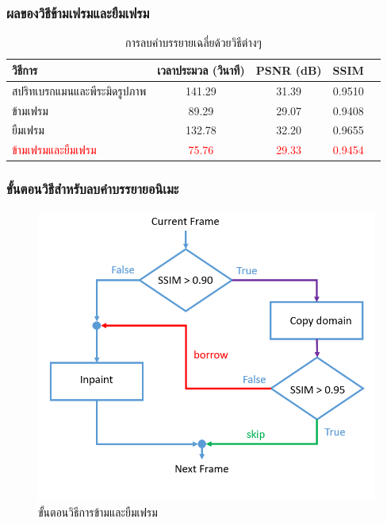 \documentclass[xcolor=dvipsnames, xetex,serif]{beamer}
\numberwithin{equation}{section}
\begin{document}
    \begin{frame}
        \frametitle{ผลของวิธีข้ามเฟรมและยืมเฟรม}
        \begin{table}[H]
            \centering
            \begin{tabular}[ht]{|l|c|c|c|c|}
                \hline
                วิธีการ  & เวลาประมวล  (วินาที) & PSNR (dB) & SSIM \\
                \hline
                สปริทเบรกแมนและพีระมิดรูปภาพ & 141.29 & 31.39  &  0.9510\\
                ข้ามเฟรม & 89.29 & 29.07 & 0.9408 \\
                ยืมเฟรม & 132.78 & 32.20 & 0.9655\\
                \textcolor{red}{ข้ามเฟรมและยืมเฟรม} & \textcolor{red}{75.76} & \textcolor{red}{29.33} & \textcolor{red}{0.9454} \\
                \hline
            \end{tabular}
            \caption{การลบคำบรรยายเฉลี่ยด้วยวิธีต่างๆ}
        \end{table}	
    \end{frame}
    \begin{frame}
        \frametitle{ขั้นตอนวิธีสำหรับลบคำบรรยายอนิเมะ}  
        \begin{figure}[H]
            \centering
            \includegraphics[width=0.6\linewidth]{images/skipborrow/flowchart-skipandborrow.png}
            \caption{ขั้นตอนวิธีการข้ามและยืมเฟรม}
        \end{figure}        
    \end{frame}
\end{document}
